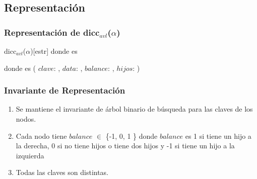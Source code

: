 




\subsection{Representación}

	\subsubsection{Representación de dicc$_{avl}$($\alpha$)}

	\begin{Estructura}{dicc$_{avl}$($\alpha$)}[estr]
		\- \- \- \- donde  es 

		\- \- \- \- donde  es
			(
				$clave$: ,
				$data$: \TipoVariable{$\alpha$},
				$balance$: ,
				$hijos$: 
			)
	\end{Estructura}



	\subsubsection{Invariante de Representación}
	  \begin{enumerate}
		\item{Se mantiene el invariante de árbol binario de búsqueda para las claves de los nodos.}
		\item{Cada nodo tiene $balance$ $\in$ \{-1, 0, 1 \} donde $balance$ es 1 si tiene un hijo a la derecha, 0 si no tiene hijos o tiene dos hijos y -1 si tiene un hijo a la izquierda}
		\item{Todas las claves son distintas.}
	  \end{enumerate}

